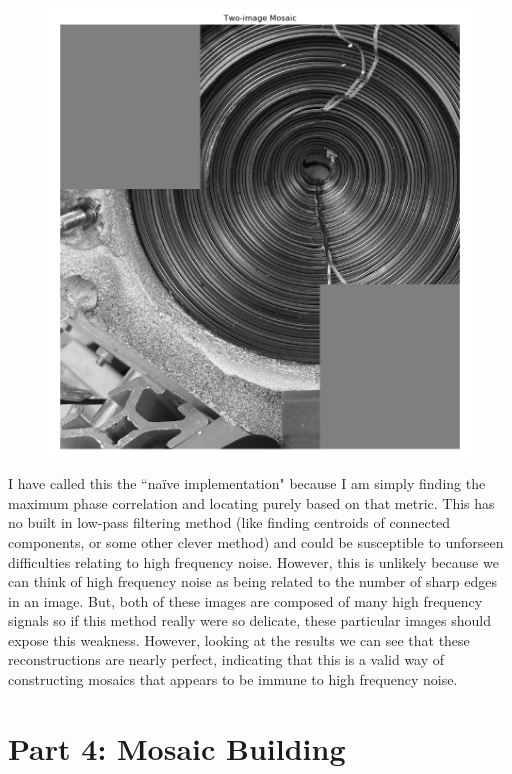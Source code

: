 \documentclass[]{article}
\begin{document}
\begin{figure}[H]
	\centering
	\includegraphics[width=6.5in]{p3_output/img_1_mosaic.png}
\end{figure}
\vskip 5pt
I have called this the ``na\"ive implementation" because I am simply finding the maximum phase correlation and locating purely based on that metric. This has no built in low-pass filtering method (like finding centroids of connected components, or some other clever method) and could be susceptible to unforseen difficulties relating to high frequency noise. However, this is unlikely because we can think of high frequency noise as being related to the number of sharp edges in an image. But, both of these images are composed of many high frequency signals so if this method really were so delicate, these particular images should expose this weakness. However, looking at the results we can see that these reconstructions are nearly perfect, indicating that this is a valid way of constructing mosaics that appears to be immune to high frequency noise.

\newpage

\section{Part 4: Mosaic Building}
\end{document}
